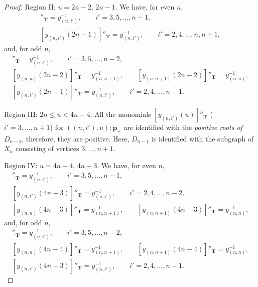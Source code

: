 \documentclass[pdftex]{sigma}
\numberwithin{equation}{section}
\theoremstyle{definition}
\begin{document}
\begin{proof}
Region II: $u=2n-2$, $2n-1$.
We have, for even $n$,
\begin{gather*}
[y_{(n,i')}(2n-2)]''_{\mathbf{T}} =y_{(n,i')}^{-1},\qquad  i'=3,5,\dots,n-1 ,\nonumber\\
[y_{(n,i')}(2n-1)]''_{\mathbf{T}} =y_{(n,i')}^{-1},\qquad  i'=2,4,\dots,n,n+1 ,%
\end{gather*}
and, for odd $n$,
\begin{gather*}
[y_{(n,i')}(2n-2)]''_{\mathbf{T}} =y_{(n,i')}^{-1}, \qquad  i'=3,5,\dots,n-2 ,\nonumber\\
[y_{(n,n)}(2n-2)]''_{\mathbf{T}} =y_{(n,n+1)}^{-1},
\qquad [y_{(n,n+1)}(2n-2)]''_{\mathbf{T}}=y_{(n,n)}^{-1},\nonumber\\
[y_{(n,i')}(2n-1)]''_{\mathbf{T}} =y_{(n,i')}^{-1},\qquad i'=2,4,\dots,n-1.%
\end{gather*}

Region III: $2n \leq u < 4n-4$.
All the  monomials
$[y_{(n,i')} (u)]''_{\mathbf{T}}$ ($i'=3,\dots,n+1$)
 for $((n,i'),u):\mathbf{p}_+$
are  identif\/ied with
the {\em positive roots of $D_{n-1}$},
therefore, they are positive.
Here, $D_{n-1}$ is identif\/ied with the subgraph of $X_n$
consisting of vertices $3, \dots, n+1$.

Region IV: $u=4n-4$, $4n-3$. We have, for even $n$,
\begin{gather}
[y_{(n,i')}(4n-4)]''_{\mathbf{T}} =y_{(n,i')}^{-1}, \qquad i'=3,5,\dots,n-1,\nonumber\\
[y_{(n,i')}(4n-3)]''_{\mathbf{T}} =y_{(n,i')}^{-1}, \qquad i'=2,4,\dots,n-2,\nonumber\\
[y_{(n,n)}(4n-3)]''_{\mathbf{T}} =y_{(n,n+1)}^{-1},
\qquad [y_{(n,n+1)}(4n-3)]''_{\mathbf{T}}=y_{(n,n)}^{-1},\label{eq:yt3}
\end{gather}
and, for odd $n$,
\begin{gather}
[y_{(n,i')}(4n-4)]''_{\mathbf{T}} =y_{(n,i')}^{-1}, \qquad  i'=3,5,\dots,n-2 ,\nonumber\\
[y_{(n,n)}(4n-4)]''_{\mathbf{T}} =y_{(n,n+1)}^{-1},
\qquad [y_{(n,n+1)}(4n-4)]''_{\mathbf{T}}=y_{(n,n)}^{-1},\nonumber\\
[y_{(n,i')}(4n-3)]''_{\mathbf{T}} =y_{(n,i')}^{-1},\qquad i'=2,4,\dots,n-1.\label{eq:yt6}
\end{gather}


\end{proof}
\end{document}
